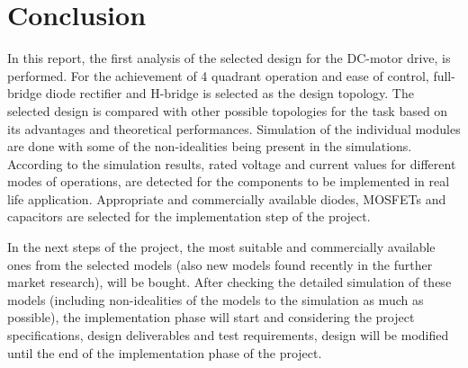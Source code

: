 \section{Conclusion} \label{conclude}

In this report, the first analysis of the selected design for the DC-motor drive, is performed. For the achievement of 4 quadrant operation and ease of control, full-bridge diode rectifier and H-bridge is selected as the design topology. The selected design is compared with other possible topologies for the task based on its advantages and theoretical performances. Simulation of the individual modules are done with some of the non-idealities being present in the simulations. According to the simulation results, rated voltage and current values for different modes of operations, are detected for the components to be implemented in real life application. Appropriate and commercially available diodes, MOSFETs and capacitors are selected for the implementation step of the project.

In the next steps of the project, the most suitable and commercially available ones from the selected models (also new models found recently in the further market research), will be bought. After checking the detailed simulation of these models (including non-idealities of the models to the simulation as much as possible), the implementation phase will start and considering the project specifications, design deliverables and test requirements, design will be modified until the end of the implementation phase of the project.